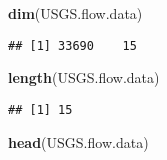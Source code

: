 \documentclass[]{article}
\newenvironment{Shaded}{\begin{snugshade}}{\end{snugshade}}
\newcommand{\KeywordTok}[1]{\textcolor[rgb]{0.13,0.29,0.53}{\textbf{#1}}}
\newcommand{\NormalTok}[1]{#1}
\begin{document}
\begin{Shaded}
\begin{Highlighting}[]
\KeywordTok{dim}\NormalTok{(USGS.flow.data)}
\end{Highlighting}
\end{Shaded}

\begin{verbatim}
## [1] 33690    15
\end{verbatim}

\begin{Shaded}
\begin{Highlighting}[]
\KeywordTok{length}\NormalTok{(USGS.flow.data)}
\end{Highlighting}
\end{Shaded}

\begin{verbatim}
## [1] 15
\end{verbatim}

\begin{Shaded}
\begin{Highlighting}[]
\KeywordTok{head}\NormalTok{(USGS.flow.data)}
\end{Highlighting}
\end{Shaded}
\end{document}
